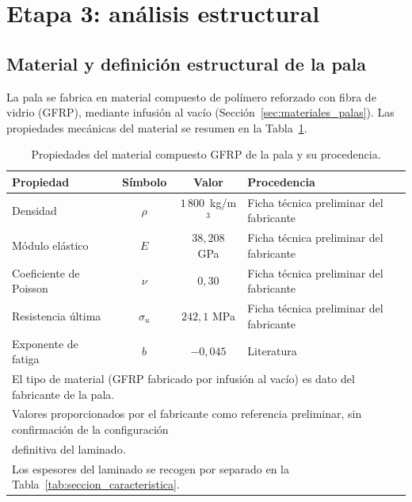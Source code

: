 \section{Etapa 3: análisis estructural}

\subsection{Material y definición estructural de la pala}
\label{sec:material_pala}

La pala se fabrica en material compuesto de polímero reforzado con fibra de vidrio (GFRP), mediante infusión al vacío (Sección~\ref{sec:materiales_palas}). Las propiedades mecánicas del material se resumen en la Tabla~\ref{tab:material_pala}.

\begin{table}[H]
    \centering
    \caption{Propiedades del material compuesto GFRP de la pala y su procedencia.}
    \label{tab:material_pala}
    \begin{tabular}{lccl}
        \hline
        \textbf{Propiedad} & \textbf{Símbolo} & \textbf{Valor} & \textbf{Procedencia}\\
        \hline
        Densidad & $\rho$ & $1\,800$~kg/m$^3$ & Ficha técnica preliminar del fabricante\\
        Módulo elástico & $E$ & $38{,}208$ GPa & Ficha técnica preliminar del fabricante\\
        Coeficiente de Poisson & $\nu$ & $0{,}30$ & Ficha técnica preliminar del fabricante\\
        Resistencia última & $\sigma_u$ & $242{,}1$ MPa & Ficha técnica preliminar del fabricante\\
        Exponente de fatiga & $b$ & $-0{,}045$ & Literatura~\parencite{Huh2012}\\
        \hline
        \multicolumn{4}{l}{\footnotesize El tipo de material (GFRP fabricado por infusión al vacío) es dato del fabricante de la pala.}\\
        \multicolumn{4}{l}{\footnotesize Valores proporcionados por el fabricante como referencia preliminar, sin confirmación de la configuración}\\
        \multicolumn{4}{l}{\footnotesize definitiva del laminado.}\\
        \multicolumn{4}{l}{\footnotesize Los espesores del laminado se recogen por separado en la Tabla~\ref{tab:seccion_caracteristica}.}
    \end{tabular}
\end{table}

